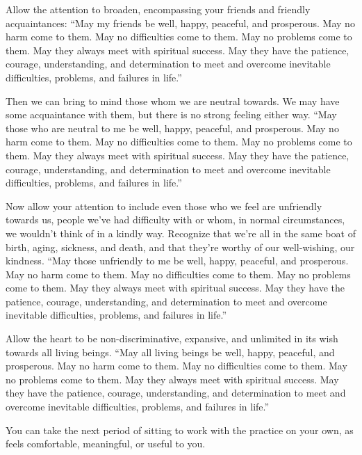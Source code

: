 Allow the attention to broaden, encompassing your friends and friendly
acquaintances: “May my friends be well, happy, peaceful, and prosperous.
May no harm come to them. May no difficulties come to them. May no
problems come to them. May they always meet with spiritual success. May
they have the patience, courage, understanding, and determination to
meet and overcome inevitable difficulties, problems, and failures in
life.”

Then we can bring to mind those whom we are neutral towards. We may have
some acquaintance with them, but there is no strong feeling either way.
“May those who are neutral to me be well, happy, peaceful, and
prosperous. May no harm come to them. May no difficulties come to them.
May no problems come to them. May they always meet with spiritual
success. May they have the patience, courage, understanding, and
determination to meet and overcome inevitable difficulties, problems,
and failures in life.”

Now allow your attention to include even those who we feel are
unfriendly towards us, people we’ve had difficulty with or whom, in
normal circumstances, we wouldn’t think of in a kindly way. Recognize
that we’re all in the same boat of birth, aging, sickness, and death,
and that they’re worthy of our well-wishing, our kindness. “May those
unfriendly to me be well, happy, peaceful, and prosperous. May no harm
come to them. May no difficulties come to them. May no problems come to
them. May they always meet with spiritual success. May they have the
patience, courage, understanding, and determination to meet and overcome
inevitable difficulties, problems, and failures in life.”

Allow the heart to be non-discriminative, expansive, and unlimited in
its wish towards all living beings. “May all living beings be well,
happy, peaceful, and prosperous. May no harm come to them. May no
difficulties come to them. May no problems come to them. May they always
meet with spiritual success. May they have the patience, courage,
understanding, and determination to meet and overcome inevitable
difficulties, problems, and failures in life.”

You can take the next period of sitting to work with the practice on
your own, as feels comfortable, meaningful, or useful to you.
